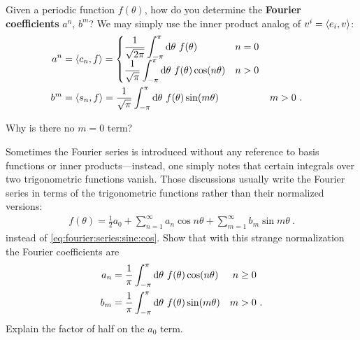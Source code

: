 Given a periodic function $f(\theta)$, how do you determine the \textbf{Fourier coefficients} $a^{n}$, $b^m$? We may simply use the inner product analog of $v^i = \langle e_i, v\rangle$:
\begin{align}
    a^n &= 
    \langle c_n, f\rangle =
    \begin{cases}
    \displaystyle
    \frac{1}{\sqrt{2\pi}}\int_{-\pi}^\pi
    \operatorname{d}\mkern-3mu^{}\mkern-1mu{\theta}\,\, f(\theta) & n= 0
    \\
    \displaystyle
    \frac{1}{\sqrt{\pi}}\int_{-\pi}^\pi
    \operatorname{d}\mkern-3mu^{}\mkern-1mu{\theta}\,\, f(\theta) \cos(n\theta) & n> 0
    \end{cases}    
    \\
    b^m &= 
    \langle s_n, f\rangle =
    \frac{1}{\sqrt{\pi}}
    \int_{-\pi}^\pi
    \operatorname{d}\mkern-3mu^{}\mkern-1mu{\theta}\,\, f(\theta) \sin(m\theta) 
    & m&> 0
    \ .
\end{align}
\begin{exercise}
Why is there no $m=0$ term? 
\end{exercise}

\begin{exercise}
Sometimes the Fourier series is introduced without any reference to basis functions or inner products---instead, one simply notes that certain integrals over two trigonometric functions vanish. Those discussions usually write the Fourier series in terms of the trigonometric functions rather than their normalized versions:
\begin{align}
    f(\theta) = \frac{1}{2}a_0
    + \sum_{n=1}^\infty a_n \cos n\theta
    + \sum_{m=1}^\infty b_m \sin m\theta \ .
    \label{eq:fourier:series:sine:cos:nonorm}
\end{align}
instead of \eqref{eq:fourier:series:sine:cos}. Show that with this strange normalization the Fourier coefficients are
\begin{align}
    a_n &= \frac{1}{\pi}\int_{-\pi}^\pi
    \operatorname{d}\mkern-3mu^{}\mkern-1mu{\theta}\,\, f(\theta) \cos(n\theta) & n&\geq 0
    \\
    b_m &= \frac{1}{\pi}\int_{-\pi}^\pi
    \operatorname{d}\mkern-3mu^{}\mkern-1mu{\theta}\,\, f(\theta) \sin(m\theta) 
    & m&> 0
    \ .
\end{align} 
Explain the factor of half on the $a_0$ term.
\end{exercise}

